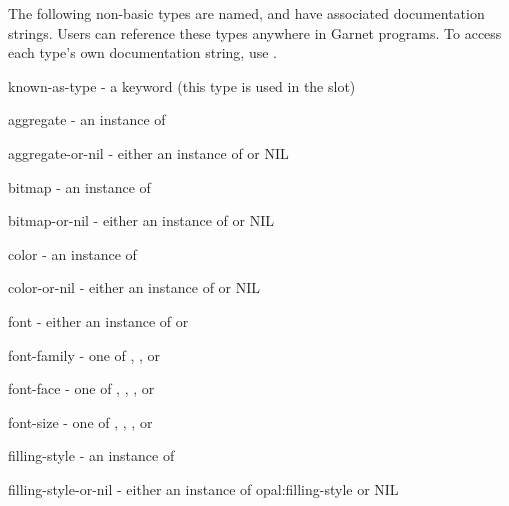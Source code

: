 \begin{group}
The following non-basic types are named, and have associated documentation
strings.  Users can reference these types anywhere in Garnet programs.
To access each type's own documentation string, use
.

\begin{description}
\item[] {\sc known-as-type} - a keyword (this type is used in the  slot)

\item[] {\sc aggregate} - an instance of 

\item[] {\sc aggregate-or-nil} - either an instance of  or NIL

\item[] {\sc bitmap} - an instance of 

\item[] {\sc bitmap-or-nil} - either an instance of  or NIL

\item[] {\sc color} - an instance of 

\item[] {\sc color-or-nil} - either an instance of  or NIL

\item[] {\sc font} - either an instance of  or 

\item[] {\sc font-family} - one of , , or 

\item[] {\sc font-face} - one of , , , or

\item[] {\sc font-size} - one of , , , or

\item[] {\sc filling-style} - an instance of 

\item[] {\sc filling-style-or-nil} - either an instance of opal:filling-style or NIL


\end{description}
\end{group}
